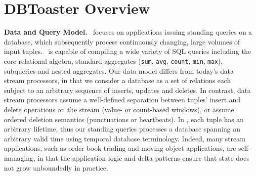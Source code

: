 \section{DBToaster Overview}

\noindent\textbf{Data and Query Model.}
\compiler\ focuses on applications issuing standing queries on a database, which
subsequently process continuously changing, large volumes of input tuples.
\compiler\ is capable of compiling a wide variety of SQL queries including the
core relational algebra, standard aggregates (\texttt{sum}, \texttt{avg},
\texttt{count}, \texttt{min}, \texttt{max}), subqueries and nested aggregates.
Our data model differs from today's data stream processors, in that we consider a
database as a set of relations each subject to an arbitrary sequence of inserts,
updates and deletes. In contrast, data stream processors assume a well-defined
separation between tuples' insert and delete operations on the stream (value- or
count-based windows), or assume ordered deletion semantics (punctuations or
heartbeats). In \compiler, each tuple has an arbitrary lifetime, thus our
standing queries processes a database spanning an arbitrary valid time using
temporal database terminology. Indeed, many stream applications, such as
order book trading and moving object applications, are self-managing, in that the
application logic and delta patterns ensure that state does not grow unboundedly in
practice.



